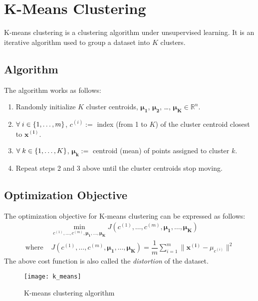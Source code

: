 \documentclass[a4paper, 12pt]{article}
\begin{document}
\section{K-Means Clustering}
K-means clustering is a clustering algorithm under unsupervised learning. It is an iterative algorithm used to group a dataset into $K$ clusters.

\subsection{Algorithm}
The algorithm works as follows:
\begin{enumerate}
\item Randomly initialize $K$ cluster centroids, $\bm{\mu_1}$, $\bm{\mu_2}$, \dots, $\bm{\mu_K} \in \mathbb{R}^n$.
\item $\forall \hspace{1mm} i \in \{1, \dots, m\}$, $c^{\left(i\right)} := $ index (from 1 to $K$) of the cluster centroid closest to $\bm{x^{\left(i\right)}}$.
\item $\forall \hspace{1mm} k \in \{1, \dots, K\}$, $\bm{\mu_k} := $ centroid (mean) of points assigned to cluster $k$.
\item Repeat steps 2 and 3 above until the cluster centroids stop moving.
\end{enumerate}

\subsection{Optimization Objective}
The optimization objective for K-means clustering can be expressed as follows:
\begin{align*}
&\min_{c^{\left(1\right)}, \dots, c^{\left(m\right)}, \bm{\mu_1}, \dots, \bm{\mu_K}} J\left(c^{\left(1\right)}, \dots, c^{\left(m\right)}, \bm{\mu_1}, \dots, \bm{\mu_K}\right) \\
\text{where } & J\left(c^{\left(1\right)}, \dots, c^{\left(m\right)}, \bm{\mu_1}, \dots, \bm{\mu_K}\right) = \dfrac{1}{m}\sum_{i=1}^{m}\lVert \bm{x^{\left(i\right)}} - \mu_{c^{\left(i\right)}} \rVert^2
\end{align*}
The above cost function is also called the \textit{distortion} of the dataset.
\begin{figure}[H]
\centering
\texttt{[image: k\_means]}
\caption{K-means clustering algorithm}
\end{figure}
\end{document}
